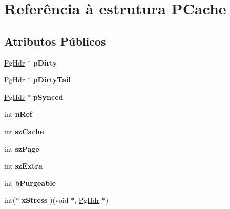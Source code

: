 \hypertarget{struct_p_cache}{\section{Referência à estrutura P\-Cache}
\label{struct_p_cache}
}
\subsection*{Atributos Públicos}
\begin{DoxyCompactItemize}
\item 
\hypertarget{struct_p_cache_a1c692ce92c7d3fc7c6c1324d5658b252}{\hyperlink{struct_pg_hdr}{Pg\-Hdr} $\ast$ {\bfseries p\-Dirty}}\label{struct_p_cache_a1c692ce92c7d3fc7c6c1324d5658b252}

\item 
\hypertarget{struct_p_cache_a8eaca309bfb8fa49e7c5e77dd3398bb0}{\hyperlink{struct_pg_hdr}{Pg\-Hdr} $\ast$ {\bfseries p\-Dirty\-Tail}}\label{struct_p_cache_a8eaca309bfb8fa49e7c5e77dd3398bb0}

\item 
\hypertarget{struct_p_cache_a607eabd6768dd8df47d8fa353542b106}{\hyperlink{struct_pg_hdr}{Pg\-Hdr} $\ast$ {\bfseries p\-Synced}}\label{struct_p_cache_a607eabd6768dd8df47d8fa353542b106}

\item 
\hypertarget{struct_p_cache_a8270710a90112645a69cea03ab5a2d25}{int {\bfseries n\-Ref}}\label{struct_p_cache_a8270710a90112645a69cea03ab5a2d25}

\item 
\hypertarget{struct_p_cache_a93ed4b9d731d883c3ed22a5adfd9c636}{int {\bfseries sz\-Cache}}\label{struct_p_cache_a93ed4b9d731d883c3ed22a5adfd9c636}

\item 
\hypertarget{struct_p_cache_abb0bd0a3292780dcc07cb59bc577990d}{int {\bfseries sz\-Page}}\label{struct_p_cache_abb0bd0a3292780dcc07cb59bc577990d}

\item 
\hypertarget{struct_p_cache_abcb37fcd3ea098b98a196a3f69e3c135}{int {\bfseries sz\-Extra}}\label{struct_p_cache_abcb37fcd3ea098b98a196a3f69e3c135}

\item 
\hypertarget{struct_p_cache_a6dbb1820ecbfb378841ee81186ea5902}{int {\bfseries b\-Purgeable}}\label{struct_p_cache_a6dbb1820ecbfb378841ee81186ea5902}

\item 
\hypertarget{struct_p_cache_a8b177ebb03aaf4774b6137d48733eeb5}{int($\ast$ {\bfseries x\-Stress} )(void $\ast$, \hyperlink{struct_pg_hdr}{Pg\-Hdr} $\ast$)}\label{struct_p_cache_a8b177ebb03aaf4774b6137d48733eeb5}


\end{DoxyCompactItemize}
